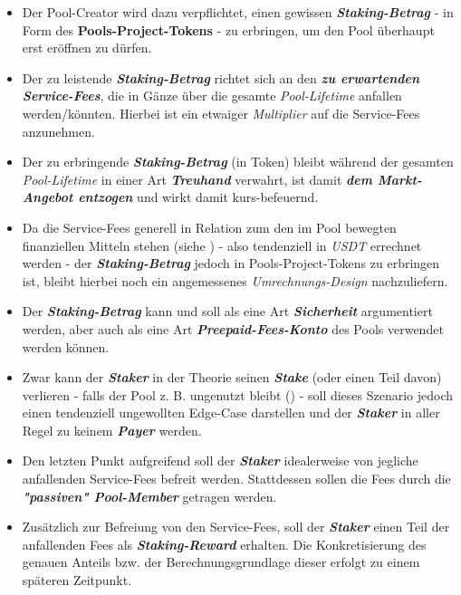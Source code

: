 \begin{Konzept}
\begin{itemize}
	\item Der Pool-Creator wird dazu verpflichtet, einen gewissen \textbf{\textit{Staking-Betrag}} - in Form des \textbf{Pools-Project-Tokens} - zu erbringen, um den Pool überhaupt erst eröffnen zu dürfen.
	\item Der zu leistende \textbf{\textit{Staking-Betrag}} richtet sich an den \textbf{\textit{zu erwartenden Service-Fees}}, die in Gänze über die gesamte \textit{Pool-Lifetime} anfallen werden/könnten. Hierbei ist ein etwaiger \textit{Multiplier} auf die Service-Fees anzunehmen.
	\item Der zu erbringende \textbf{\textit{Staking-Betrag}} (in Token) bleibt während der gesamten \textit{Pool-Lifetime} in einer Art \textbf{\textit{Treuhand}} verwahrt, ist damit \textbf{\textit{dem Markt-Angebot entzogen}} und wirkt damit kurs-befeuernd.
	\item Da die Service-Fees generell in Relation zum den im Pool bewegten finanziellen Mitteln stehen (siehe ) - also tendenziell in \textit{USDT} errechnet werden - der \textbf{\textit{Staking-Betrag}} jedoch in Pools-Project-Tokens zu erbringen ist, bleibt hierbei noch ein angemessenes \textit{Umrechnungs-Design} nachzuliefern.
	\item Der \textbf{\textit{Staking-Betrag}} kann und soll als eine Art \textbf{\textit{Sicherheit}} argumentiert werden, aber auch als eine Art \textbf{\textit{Preepaid-Fees-Konto}} des Pools verwendet werden können. 
	\item Zwar kann der \textbf{\textit{Staker}} in der Theorie seinen \textbf{\textit{Stake}} (oder einen Teil davon) verlieren - falls der Pool z. B. ungenutzt bleibt () - soll dieses Szenario jedoch einen tendenziell ungewollten Edge-Case darstellen und der \textbf{\textit{Staker}} in aller Regel zu keinem \textbf{\textit{Payer}} werden.
	\item Den letzten Punkt aufgreifend soll der \textbf{\textit{Staker}} idealerweise von jegliche anfallenden Service-Fees befreit werden. Stattdessen sollen die Fees durch die \textbf{\textit{"passiven" Pool-Member}} getragen werden.
	\item Zusätzlich zur Befreiung von den Service-Fees, soll der \textbf{\textit{Staker}} einen Teil der anfallenden Fees als \textbf{\textit{Staking-Reward}} erhalten. Die Konkretisierung des genauen Anteils bzw. der Berechnungsgrundlage dieser erfolgt zu einem späteren Zeitpunkt.

\end{itemize}
\end{Konzept}
